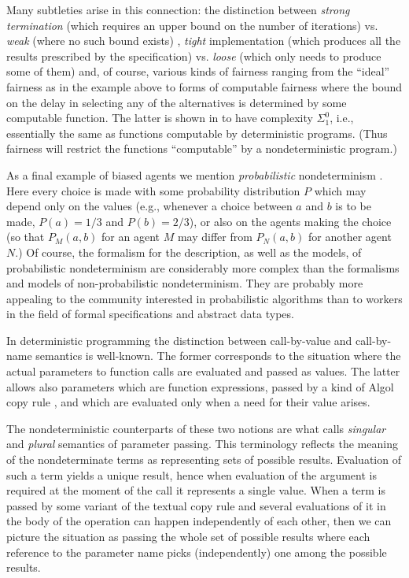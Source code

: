Many subtleties arise in this connection: the 
distinction between {\em strong termination} 
(which requires an upper bound on the number of 
iterations) vs. {\em weak} (where no such bound exists) \cite{c:5}, {\em tight}
implementation (which produces all the results prescribed by the 
specification) vs. {\em loose} (which only needs to produce some of them) 
\cite{c:21, c:99} and, of course, various kinds of fairness ranging from the 
``ideal'' 
 fairness as in the example above to forms of computable fairness 
where the bound on the delay in selecting any of the alternatives is 
determined by some computable function. The latter is shown in \cite{c:25} 
to have complexity $\Sigma_{1}^{0}$, i.e., essentially the same as 
functions computable by deterministic 
programs. (Thus fairness will restrict the functions ``computable''  
by a nondeterministic program.)\par 
As a final example of biased agents we mention {\em probabilistic} 
nondeterminism \cite{c:68, c:108, c:111, c:81}. Here every choice is made with 
some probability distribution $P$ which may depend only on the 
values (e.g., whenever a choice between $a$ and $b$
is to be made, $P(a)=1/3$ and $P(b)=2/3$), 
or also on the agents making the choice (so that 
$P_{M}(a,b)$ for an agent $M$ may differ from $P_{N}(a,b)$ for another 
agent $N$.) Of course, the formalism for the description, as well as the 
models, of probabilistic nondeterminism are considerably more complex 
than the formalisms and models of non-probabilistic nondeterminism. 
They are probably more appealing to the community interested in 
probabilistic algorithms than to workers in the field of 
formal specifications and abstract data types.   

In deterministic programming the 
distinction between call-by-value and call-by-name semantics is 
well-known. The former corresponds to the situation where the actual 
parameters to function calls are evaluated and passed as values. The 
latter allows also parameters which are function expressions, 
passed by a kind of Algol copy rule \cite{c:113}, and which are 
evaluated only when a need for their value arises.

The nondeterministic 
counterparts of these two notions are what \cite{c:110} calls {\em singular} 
and {\em plural} semantics of parameter passing. 
This terminology reflects the meaning of the nondeterminate 
terms as representing sets of possible results. Evaluation of such a term yields a 
unique result, hence when evaluation of the argument is required at 
the moment of the call it represents a single value. When a term is 
passed by some variant of the textual copy rule and several 
evaluations of it in the body of the operation can happen 
independently of each other, then we can picture the situation as 
passing the whole set of possible results where each reference to the 
parameter name picks (independently) one among the possible results.

